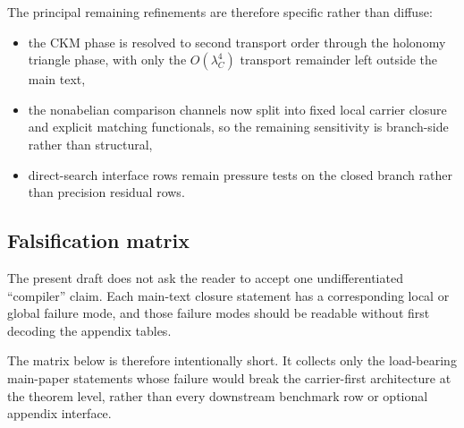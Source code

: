 The principal remaining refinements are therefore specific rather than diffuse:
\begin{itemize}[leftmargin=1.5em, topsep=3pt, itemsep=2pt]
    \item the CKM phase is resolved to second transport order through the holonomy triangle phase, with only the $O(\lambda_C^4)$ transport remainder left outside the main text,
    \item the nonabelian comparison channels now split into fixed local carrier closure and explicit matching functionals, so the remaining sensitivity is branch-side rather than structural,
    \item direct-search interface rows remain pressure tests on the closed branch rather than precision residual rows.
\end{itemize}

\subsection{Falsification matrix}

The present draft does not ask the reader to accept one undifferentiated \enquote{compiler} claim. Each main-text closure statement has a corresponding local or global failure mode, and those failure modes should be readable without first decoding the appendix tables.

The matrix below is therefore intentionally short. It collects only the load-bearing main-paper statements whose failure would break the carrier-first architecture at the theorem level, rather than every downstream benchmark row or optional appendix interface.

